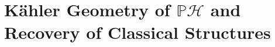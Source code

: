 \chapter{Kähler Geometry of $\mathbb{P}\mathcal{H}$ and Recovery of Classical Structures}
\label{cap:kahler}
